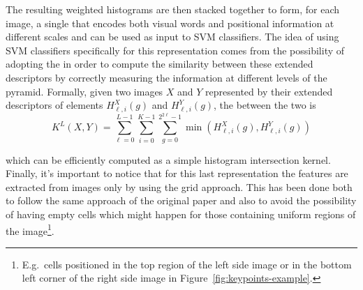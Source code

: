 \documentclass[../main.tex]{subfiles}
\begin{document}
The resulting weighted histograms are then stacked together to form, for each
image, a single 
that encodes both visual words and positional information at different
scales and can be used as input to SVM classifiers.
The idea of using SVM classifiers specifically for this representation comes
from the possibility of adopting the  in order to
compute the similarity between these extended descriptors by correctly measuring
the information at different levels of the pyramid. Formally, given two images
$X$ and $Y$ represented by their extended descriptors of elements
$H^{X}_{\ell, i}(g)$ and $H^{Y}_{\ell, i}(g)$,
the  between the two is 
\begin{equation}
  K^{L}(X,Y) = 
  \sum_{\ell=0}^{L-1}
  \sum_{i=0}^{K-1}
  \sum_{g=0}^{2^{2 \ell}-1}
  \min\left(H_{\ell, i}^{X}(g), H_{\ell, i}^{Y}(g)\right)
\end{equation}

which can be efficiently computed as a simple histogram intersection kernel.\\
Finally, it's important to notice that for this last representation the features
are extracted from images only by using the grid approach. This has been done
both to follow the same approach of the original paper and also to avoid the
possibility of having empty cells which might happen for those containing
uniform regions of the image\footnote{E.g.\ cells positioned in the top region
	of the left side image or in the bottom left corner of the right side
image in Figure~\ref{fig:keypoints-example}.}.
\end{document}

